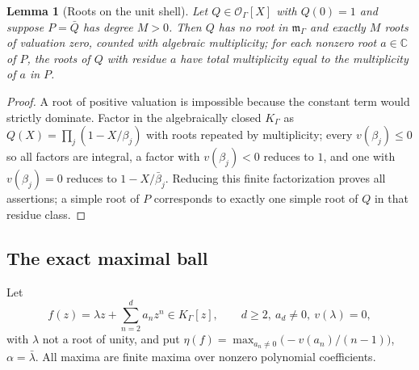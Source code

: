 \documentclass[11pt,letterpaper]{article}
\newtheorem{lemma}[lemma]{Lemma}
\theoremstyle{definition}
\theoremstyle{remark}
\newcommand{\C}{\mathbb C}
\newcommand{\OO}{\mathcal O}
\newcommand{\m}{\mathfrak m}
\numberwithin{equation}{section}
\begin{document}
\begin{lemma}[Roots on the unit shell]\label{dyn:lem:root-count}
Let $Q\in\OO_\Gamma[X]$ with $Q(0)=1$ and suppose $P=\bar Q$ has degree
$M>0$. Then $Q$ has no root in $\m_\Gamma$ and exactly $M$ roots of
valuation zero, counted with algebraic multiplicity; for each nonzero root
$a\in\C$ of $P$, the roots of $Q$ with residue $a$ have total multiplicity
equal to the multiplicity of $a$ in $P$.
\end{lemma}
\begin{proof}
A root of positive valuation is impossible because the constant term would
strictly dominate. Factor in the algebraically closed $K_\Gamma$ as
$Q(X)=\prod_j(1-X/\beta_j)$ with roots repeated by multiplicity; every
$v(\beta_j)\le0$ so all factors are integral, a factor with
$v(\beta_j)<0$ reduces to $1$, and one with $v(\beta_j)=0$ reduces to
$1-X/\bar\beta_j$. Reducing this finite factorization proves all
assertions; a simple root of $P$ corresponds to exactly one simple root of
$Q$ in that residue class.
\end{proof}

\subsection{The exact maximal ball}
Let
\begin{equation}\label{dyn:eq:f-main}
 f(z)=\lambda z+\sum_{n=2}^{d}a_nz^{n}\in K_\Gamma[z],\qquad d\ge2,\ a_d\ne0,
 \ v(\lambda)=0,
\end{equation}
with $\lambda$ not a root of unity, and put
$\eta(f)=\max_{a_n\ne0}\bigl(-v(a_n)/(n-1)\bigr)$, $\alpha=\bar\lambda$.
All maxima are finite maxima over nonzero polynomial coefficients.
\end{document}
